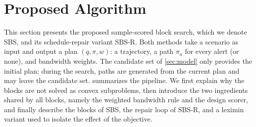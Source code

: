 \section{Proposed Algorithm}
\label{sec:method}

This section presents the proposed sample-scored block search, which we denote SBS, and its schedule-repair variant SBS-R. Both methods take a scenario as input and output a plan $(q,\pi,w)$: a trajectory, a path $\pi_a$ for every alert (or none), and bandwidth weights. The candidate set of \cref{sec:model} only provides the initial plan; during the search, paths are generated from the current plan and may leave the candidate set.  summarizes the pipeline. We first explain why the blocks are not solved as convex subproblems, then introduce the two ingredients shared by all blocks, namely the weighted bandwidth rule and the design scorer, and finally describe the blocks of SBS, the repair loop of SBS-R, and a leximin variant used to isolate the effect of the objective.

